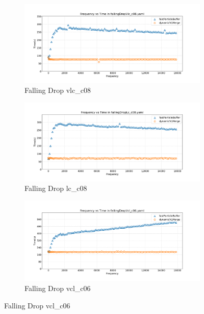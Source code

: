 \begin{figure}[htbp]
    \centering
    \vspace{-0.5em}
    \begin{subfigure}[b]{\textwidth}
        \centering
        \includegraphics[width=0.9\linewidth]{graphs/fallingDrop/normalExperiments/freq/vlcc08.png}
        \vspace{-0.5em}
        \caption{\scriptsize Falling Drop vlc\_c08}
        \label{fig:vlcc08fallingDrop}
    \end{subfigure}

    \begin{subfigure}[b]{\textwidth}
        \centering
        \includegraphics[width=0.9\linewidth]{graphs/fallingDrop/normalExperiments/freq/lcc08.png}
        \vspace{-0.5em}
        \caption{\scriptsize Falling Drop lc\_c08}
        \label{fig:lcc08explodingLiquid}
    \end{subfigure}

    \begin{subfigure}[b]{\textwidth}
        \centering
        \includegraphics[width=0.9\linewidth]{graphs/fallingDrop/normalExperiments/freq/vclc06.png}
        \vspace{-0.5em}
        \caption{\scriptsize Falling Drop vcl\_c06}
        \label{fig:vclc06constantVelocityCube}
    \end{subfigure}


\end{figure}
